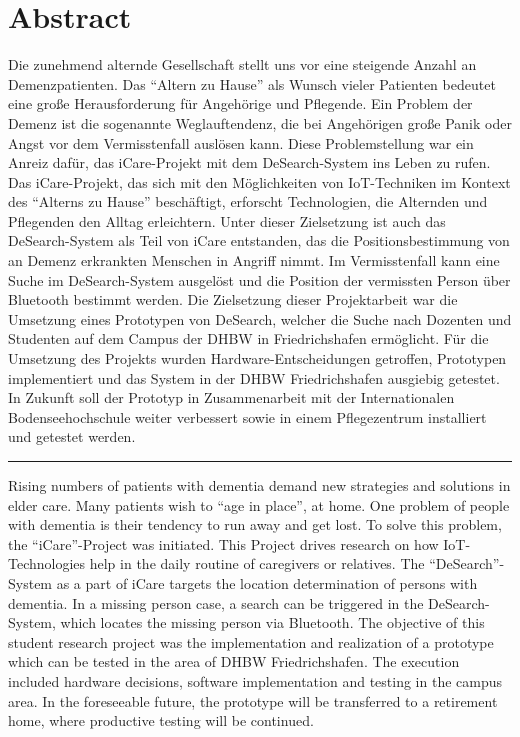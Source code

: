 \section*{Abstract}
Die zunehmend alternde Gesellschaft stellt uns vor eine steigende Anzahl an Demenzpatienten. Das \enquote{Altern zu Hause} als Wunsch vieler Patienten bedeutet eine große Herausforderung für Angehörige und Pflegende. Ein Problem der Demenz ist die sogenannte Weglauftendenz, die bei Angehörigen große Panik oder Angst vor dem Vermisstenfall auslösen kann. Diese Problemstellung war ein Anreiz dafür, das iCare-Projekt mit dem DeSearch-System ins Leben zu rufen.\\
Das iCare-Projekt, das sich mit den Möglichkeiten von IoT-Techniken im Kontext des \enquote{Alterns zu Hause} beschäftigt, erforscht Technologien, die Alternden und Pflegenden den Alltag erleichtern. Unter dieser Zielsetzung ist auch das DeSearch-System als Teil von iCare entstanden, das die Positionsbestimmung von an Demenz erkrankten Menschen in Angriff nimmt. Im Vermisstenfall kann eine Suche im DeSearch-System ausgelöst und die Position der vermissten Person über Bluetooth bestimmt werden. Die Zielsetzung dieser Projektarbeit war die Umsetzung eines Prototypen von DeSearch, welcher die Suche nach Dozenten und Studenten auf dem Campus der DHBW in Friedrichshafen ermöglicht. 
Für die Umsetzung des Projekts wurden Hardware-Entscheidungen getroffen, Prototypen implementiert und das System in der DHBW Friedrichshafen ausgiebig getestet. In Zukunft soll der Prototyp in Zusammenarbeit mit der Internationalen Bodenseehochschule weiter verbessert sowie in einem Pflegezentrum installiert und getestet werden.
\begin{center}
	\rule{0.3\textwidth}{0.4mm}
\end{center}
Rising numbers of patients with dementia demand new strategies and solutions in elder care. Many patients wish to \enquote{age in place}, at home. One problem of people with dementia is their tendency to run away and get lost. To solve this problem, the \enquote{iCare}-Project was initiated. This Project drives research on how IoT-Technologies help in the daily routine of caregivers or relatives. The \enquote{DeSearch}-System as a part of iCare targets the location determination of persons with dementia. In a missing person case, a search can be triggered in the DeSearch-System, which locates the missing person via Bluetooth. The objective of this student research project was the implementation and realization of a prototype which can be tested in the area of DHBW Friedrichshafen. The execution included hardware decisions, software implementation and testing in the campus area. In the foreseeable future, the prototype will be transferred to a retirement home, where productive testing will be continued. 
